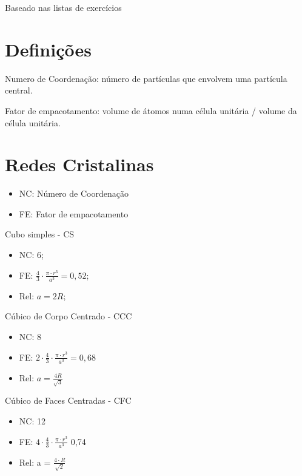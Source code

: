 {\normalsize Baseado nas listas de exercícios}
\section{Definições}

Numero de Coordenação: número de partículas que envolvem uma partícula central.

Fator de empacotamento: volume de átomos numa célula unitária / volume da célula unitária.



\section{Redes Cristalinas}


\begin{itemize}
	\setlength{\parskip}{0pt}
	\setlength{\itemsep}{0pt plus 1pt}
	
	\item NC: Número de Coordenação
	\item FE: Fator de empacotamento
\end{itemize}


Cubo simples - CS




\begin{itemize}
	\item NC: 6;
	\item FE: $\frac{4}{3} \cdot \frac{\pi \cdot r^{3}}{a^{3}} = 0,52$;
	\item Rel: $a = 2R$;	
\end{itemize}


Cúbico de Corpo Centrado - CCC

\begin{itemize}
	\item NC: 8
	\item FE: $2 \cdot \frac{4}{3} \cdot \frac{\pi \cdot r^{3}}{a^{3}} = 0,68$
	\item Rel: $a = \frac{4R}{\sqrt{3}}$
\end{itemize}


Cúbico de Faces Centradas - CFC

\begin{itemize}
	\setlength{\parskip}{0pt}
	\setlength{\itemsep}{0pt plus 1pt}
	
	\item NC: 12
	\item FE: $4 \cdot \frac{4}{3} \cdot \frac{\pi \cdot r^{3}}{a^{3}}$ 0,74
	\item Rel: a = $\frac{4 \cdot R}{\sqrt{2}}$
\end{itemize}

